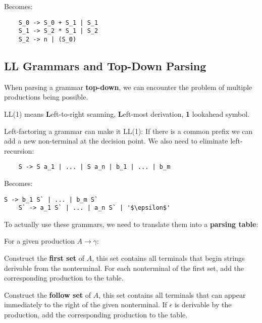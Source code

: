 Becomes:\smallskip

\begin{lstlisting}
	S_0 -> S_0 + S_1 | S_1
	S_1 -> S_2 * S_1 | S_2
	S_2 -> n | (S_0)
\end{lstlisting}


\subsection*{LL Grammars and Top-Down Parsing}

When parsing a grammar \textbf{top-down}, we can encounter the problem of multiple productions being possible. \medskip

LL(1) means \textbf{L}eft-to-right scanning, \textbf{L}eft-most derivation, \textbf{1} lookahead symbol. \medskip

Left-factoring a grammar can make it LL(1): If there is a common prefix we can add a new non-terminal at the decision point. We also need to eliminate left-recursion:\smallskip

\begin{lstlisting}
 	S -> S a_1 | ... | S a_n | b_1 | ... | b_m
\end{lstlisting}\smallskip

Becomes:\smallskip

\begin{lstlisting}[escapeinside='']
	S -> b_1 S` | ... | b_m S`		
	S` -> a_1 S` | ... | a_n S` | '$\epsilon$'
\end{lstlisting}\medskip


\columnbreak


To actually use these grammars, we need to translate them into a \textbf{parsing table}: \medskip

For a given production $A \to \gamma$:
\begin{compactitem}[$\quad\bullet$]
	\item Construct the \textbf{first set} of $A$, this set contains all terminals that begin strings derivable from the nonterminal. For each nonterminal of the first set, add the corresponding production to the table.

	\item Construct the \textbf{follow set} of $A$, this set contains all terminals that can appear immediately to the right of the given nonterminal. If $\epsilon$ is derivable by the production, add the corresponding production to the table.
\end{compactitem}

